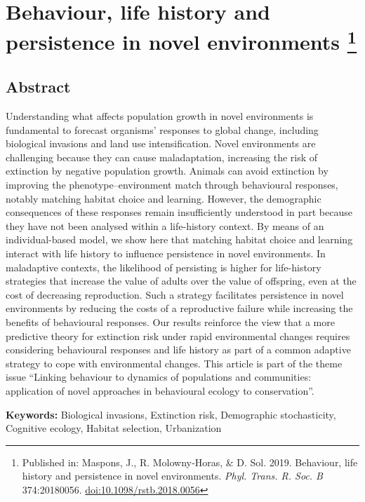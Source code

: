 \chapter[Behaviour and life history in novel environments]{Behaviour, life
history and persistence in novel environments
  \footnote{Published in: Maspons, J., R. Molowny‐Horas, \& D. Sol. 2019. Behaviour, life
  history and persistence in novel environments. \textit{Phyl. Trans. R. Soc. B}
  374:20180056.
  \href{http://dx.doi.org/10.1098/rstb.2018.0056}{doi:10.1098/rstb.2018.0056}
  }
}\label{ch:LH-Behaviour model}


\section*{Abstract}

Understanding what affects population growth in novel environments is
fundamental to forecast organisms’ responses to global change, including
biological invasions and land use intensification. Novel environments are
challenging because they can cause maladaptation, increasing the risk of
extinction by negative population growth. Animals can avoid extinction by
improving the phenotype–environment match through behavioural
responses, notably matching habitat choice and learning. However, the 
demographic consequences of these responses remain insufficiently understood in
part because they have not been analysed within a life-history context. By
means of an individual-based model, we show here that matching habitat
choice and learning interact with life history to influence persistence in
novel environments. In maladaptive contexts, the likelihood of persisting is
higher for life-history strategies that increase the value of adults over the
value of offspring, even at the cost of decreasing reproduction. Such a strategy
facilitates persistence in novel environments by reducing the costs of a 
reproductive failure while increasing the benefits of behavioural responses. Our
results reinforce the view that a more predictive theory for extinction risk
under rapid environmental changes requires considering behavioural
responses and life history as part of a common adaptive strategy to cope
with environmental changes.
This article is part of the theme issue ``Linking behaviour to dynamics of
populations and communities: application of novel approaches in behavioural
ecology to conservation''.

\bigskip
\textbf{Keywords:} Biological invasions, Extinction risk, Demographic
stochasticity, Cognitive ecology, Habitat selection, Urbanization

